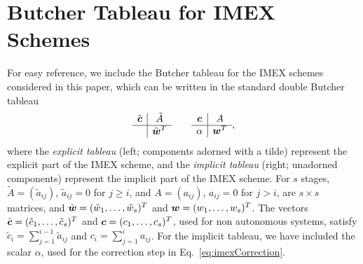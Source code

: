 \appendix

\section{Butcher Tableau for IMEX Schemes}
\label{app:butcherTables}

For easy reference, we include the Butcher tableau for the IMEX schemes considered in this paper, which can be written in the standard double Butcher tableau
\begin{equation}
  \begin{array}{c | c}
    \tilde{\boldsymbol{c}} & \tilde{A} \\
    \hline
    & \tilde{\boldsymbol{w}}^{T}
  \end{array}
  \qquad
  \begin{array}{c | c}
    \boldsymbol{c} & A \\
    \hline
    \alpha & \boldsymbol{w}^{T}
  \end{array},
\end{equation}
where the \emph{explicit tableau} (left; components adorned with a tilde) represent the explicit part of the IMEX scheme, and the \emph{implicit tableau} (right; unadorned components) represent the implicit part of the IMEX scheme.  
For $s$ stages, $\tilde{A}=(\tilde{a}_{ij})$, $\tilde{a}_{ij}=0$ for $j\ge i$, and $A=(a_{ij})$, $a_{ij}=0$ for $j>i$, are $s\times s$ matrices, and $\tilde{\boldsymbol{w}}=(\tilde{w}_{1},\ldots,\tilde{w}_{s})^{T}$ and $\boldsymbol{w}=(w_{1},\ldots,w_{s})^{T}$.  
The vectors $\tilde{\boldsymbol{c}}=(\tilde{c}_{1},\ldots,\tilde{c}_{s})^{T}$ and $\boldsymbol{c}=(c_{1},\ldots,c_{s})^{T}$, used for non autonomous systems, satisfy $\tilde{c}_{i}=\sum_{j=1}^{i-1}\tilde{a}_{ij}$ and $c_{i}=\sum_{j=1}^{i}a_{ij}$.  
For the implicit tableau, we have included the scalar $\alpha$, used for the correction step in Eq.~\eqref{eq:imexCorrection}.  

